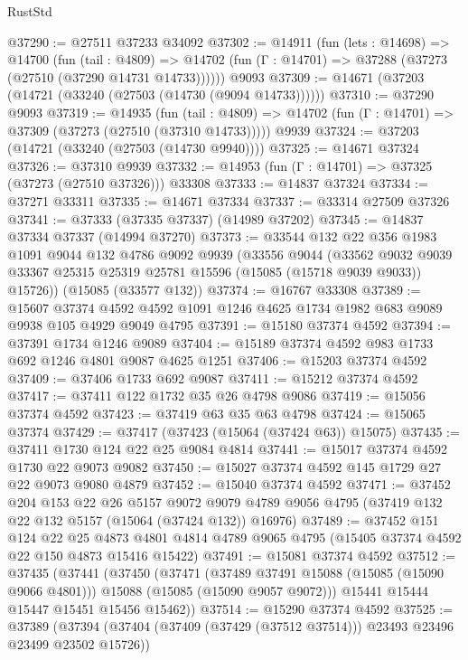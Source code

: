 \begin{lexlean}{RustStd}
\begin{coremodule}
@37290 := @27511 @37233 @34092
@37302 := @14911
    (fun (lets : @14698) =>
    @14700
      (fun (tail : @4809) =>
      @14702 (fun (Γ : @14701) => @37288 (@37273 (@27510 (@37290 @14731 @14733))))))
    @9093
@37309 := @14671 (@37203 (@14721 (@33240 (@27503 (@14730 (@9094 @14733))))))
@37310 := @37290 @9093
@37319 := @14935
    (fun (tail : @4809) => @14702 (fun (Γ : @14701) => @37309 (@37273 (@27510 (@37310 @14733)))))
    @9939
@37324 := @37203 (@14721 (@33240 (@27503 (@14730 @9940))))
@37325 := @14671 @37324
@37326 := @37310 @9939
@37332 := @14953 (fun (Γ : @14701) => @37325 (@37273 (@27510 @37326))) @33308
@37333 := @14837 @37324
@37334 := @37271 @33311
@37335 := @14671 @37334
@37337 := @33314 @27509 @37326
@37341 := @37333 (@37335 @37337) (@14989 @37202)
@37345 := @14837 @37334 @37337 (@14994 @37270)
@37373 := @33544
    @132
    @22
    @356
    @1983
    @1091
    @9044
    @132
    @4786
    @9092
    @9939
    (@33556
      @9044
      (@33562 @9032 @9039 @33367 @25315 @25319 @25781 @15596 (@15085 (@15718 @9039 @9033)) @15726))
    (@15085 (@33577 @132))
@37374 := @16767 @33308
@37389 := @15607
    @37374
    @4592
    @4592
    @1091
    @1246
    @4625
    @1734
    @1982
    @683
    @9089
    @9938
    @105
    @4929
    @9049
    @4795
@37391 := @15180 @37374 @4592
@37394 := @37391 @1734 @1246 @9089
@37404 := @15189 @37374 @4592 @983 @1733 @692 @1246 @4801 @9087 @4625 @1251
@37406 := @15203 @37374 @4592
@37409 := @37406 @1733 @692 @9087
@37411 := @15212 @37374 @4592
@37417 := @37411 @122 @1732 @35 @26 @4798 @9086
@37419 := @15056 @37374 @4592
@37423 := @37419 @63 @35 @63 @4798
@37424 := @15065 @37374
@37429 := @37417 (@37423 (@15064 (@37424 @63)) @15075)
@37435 := @37411 @1730 @124 @22 @25 @9084 @4814
@37441 := @15017 @37374 @4592 @1730 @22 @9073 @9082
@37450 := @15027 @37374 @4592 @145 @1729 @27 @22 @9073 @9080 @4879
@37452 := @15040 @37374 @4592
@37471 := @37452
    @204
    @153
    @22
    @26
    @5157
    @9072
    @9079
    @4789
    @9056
    @4795
    (@37419 @132 @22 @132 @5157 (@15064 (@37424 @132)) @16976)
@37489 := @37452
    @151
    @124
    @22
    @25
    @4873
    @4801
    @4814
    @4789
    @9065
    @4795
    (@15405 @37374 @4592 @22 @150 @4873 @15416 @15422)
@37491 := @15081 @37374 @4592
@37512 := @37435
    (@37441
      (@37450
        (@37471
          (@37489 @37491 @15088 (@15085 (@15090 @9066 @4801)))
          @15088
          (@15085 (@15090 @9057 @9072)))
        @15441
        @15444
        @15447
        @15451
        @15456
        @15462))
@37514 := @15290 @37374 @4592
@37525 := @37389
    (@37394 (@37404 (@37409 (@37429 (@37512 @37514))) @23493 @23496 @23499 @23502 @15726))

\end{coremodule}
\end{lexlean}
